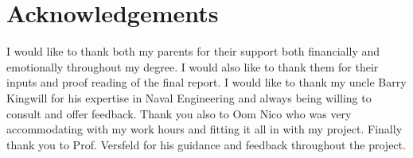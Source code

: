 \chapter{Acknowledgements}
I would like to thank both my parents for their support both financially and emotionally throughout my degree. I would also like to thank them for their inputs and proof reading of the final report. I would like to thank my uncle Barry Kingwill for his expertise in Naval Engineering and always being willing to consult and offer feedback. Thank you also to Oom Nico who was very accommodating with my work hours and fitting it all in with my project. Finally thank you to Prof. Versfeld for his guidance and feedback throughout the project. 